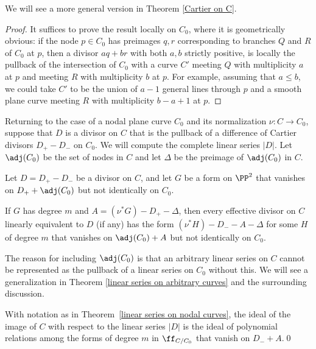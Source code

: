 We will see a more general version in Theorem \ref{Cartier on C}.

\begin{proof}
It suffices to prove the result locally on $C_{0}$, where it is
geometrically obvious:  if the node
$p\in C_{0}$ has preimages $q,r$ corresponding to  branches $Q$ and $R$ of $C_{0}$
at $p$, then
a divisor $aq+br$ with both $a,b$ strictly positive, is locally the
pullback of the intersection of $C_{0}$
with a curve $C'$ meeting $Q$ with multiplicity $a$  at $p$ and meeting $R$
with multiplicity $b$ at $p$. For example, assuming that $a\leq b$, we could take
$C'$ to be the union of $a-1$ general lines through $p$ and a smooth plane curve
meeting $R$ with multiplicity $b-a+1$ at $p$.  
\end{proof}


Returning to the case of a nodal plane curve $C_{0}$ and its normalization
$\nu: C\to C_{0}$,
suppose that $D$ is a divisor on $C$ that is the pullback of a difference
of Cartier
divisors $D_{+}-D_{-}$ on $C_{0}$. We will compute the complete linear
series $|D|$.
Let $\adj(C_{0})$ be the set of nodes in $C$ and let $\Delta$ be the
preimage of $\adj(C_{0})$ in $C$.

\begin{theorem}\label{linear series on nodal curves}
Let $D = D_{+}-D_{-}$ be a divisor on $C$, and let $G$ be a form on
$\PP^{2}$
that vanishes on  $D_{+}+\adj(C_{0})$ but not identically on $C_{0}$.

If $G$ has degree $m$ and $A = (\nu^{*}G)-D_{+}-\Delta$, then every
effective divisor on
$C$ linearly equivalent to $D$ (if any) has the form
$(\nu^*H)-D_{-}-A-\Delta$ for some $H$ of degree $m$
that vanishes on $\adj(C_{0})+A$ but not identically on $C_{0}$.
\unif
\end{theorem}

The reason for including $\adj(C_{0})$ is that an arbitrary linear series on $C$
cannot be represented as the pullback of a linear series on $C_{0}$ without this.
We will see a generalization in Theorem \ref{linear series on arbitrary curves} and the surrounding discussion.

\begin{corollary}
With notation as in Theorem~\ref{linear series on nodal curves}, the
ideal of the image of
$C$ with respect to the linear series $|D|$ is the ideal of polynomial
relations among the forms
of degree $m$ in $\ff_{C/C_{0}}$ that vanish on $D_{-}+ A$.\qed
\unif
\end{corollary}

